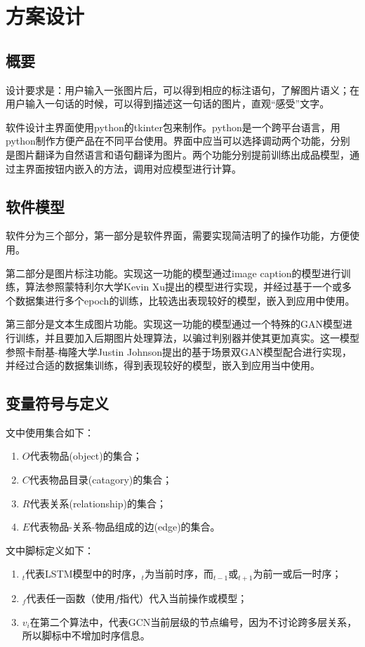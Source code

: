 
\chapter{方案设计}

\section{概要}
设计要求是：用户输入一张图片后，可以得到相应的标注语句，了解图片语义；在用户输入一句话的时候，可以得到描述这一句话的图片，直观“感受”文字。

软件设计主界面使用python的tkinter包来制作。python是一个跨平台语言，用python制作方便产品在不同平台使用。界面中应当可以选择调动两个功能，分别是图片翻译为自然语言和语句翻译为图片。两个功能分别提前训练出成品模型，通过主界面按钮内嵌入的方法，调用对应模型进行计算。

\section{软件模型}
软件分为三个部分，第一部分是软件界面，需要实现简洁明了的操作功能，方便使用。

第二部分是图片标注功能。实现这一功能的模型通过image caption的模型进行训练，算法参照蒙特利尔大学Kevin Xu提出的模型进行实现，并经过基于一个或多个数据集进行多个epoch的训练，比较选出表现较好的模型，嵌入到应用中使用。

第三部分是文本生成图片功能。实现这一功能的模型通过一个特殊的GAN模型进行训练，并且要加入后期图片处理算法，以骗过判别器并使其更加真实。这一模型参照卡耐基-梅隆大学Justin Johnson提出的基于场景双GAN模型配合进行实现，并经过合适的数据集训练，得到表现较好的模型，嵌入到应用当中使用。

\section{变量符号与定义}
文中使用集合如下：
\begin{enumerate}[fullwidth,itemindent=2em,label=\arabic*.]
    \item $O$代表物品(object)的集合；
    \item $C$代表物品目录(catagory)的集合；
    \item $R$代表关系(relationship)的集合；
    \item $E$代表物品-关系-物品组成的边(edge)的集合。
\end{enumerate}

文中脚标定义如下：
\begin{enumerate}[fullwidth,itemindent=2em,label=\arabic*.]
    \item ${}_t$代表LSTM模型中的时序，${}_t$为当前时序，而${}_{t-1}$或${}_{t+1}$为前一或后一时序；
    \item $_f$代表任一函数（使用$f$指代）代入当前操作或模型；
    \item $v_i$在第二个算法中，代表GCN当前层级的节点编号，因为不讨论跨多层关系，所以脚标中不增加时序信息。
\end{enumerate}

